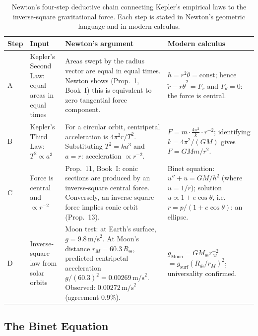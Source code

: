 \documentclass[12pt]{article}
\begin{document}
\begin{table}[h]
\centering
\renewcommand{\arraystretch}{1.3}
\caption{Newton's four-step deductive chain connecting Kepler's empirical
  laws to the inverse-square gravitational force.
  Each step is stated in Newton's geometric language and in modern calculus.}
\label{tab:newton_chain}
\begin{tabular}{@{}p{1.0cm}p{2.7cm}p{4.9cm}p{4.9cm}@{}}
\toprule
\textbf{Step} & \textbf{Input} & \textbf{Newton's argument} & \textbf{Modern calculus} \\
\midrule
A &
  Kepler's Second Law: equal areas in equal times &
  Areas swept by the radius vector are equal in equal times.
  Newton shows (Prop.~1, Book~I) this is equivalent to zero tangential
  force component. &
  $h = r^{2}\dot\theta = \text{const}$;
  hence $\ddot r - r\dot\theta^{2} = F_{r}$ and $F_{\theta}=0$:
  the force is central. \\
\addlinespace
B &
  Kepler's Third Law: $T^{2}\propto a^{3}$ &
  For a circular orbit, centripetal acceleration is $4\pi^{2}r/T^{2}$.
  Substituting $T^{2}=ka^{3}$ and $a=r$: acceleration $\propto r^{-2}$. &
  $F = m\cdot\frac{4\pi^{2}}{k}\cdot r^{-2}$;
  identifying $k=4\pi^{2}/(GM)$ gives $F=GM m/r^{2}$. \\
\addlinespace
C &
  Force is central and $\propto r^{-2}$ &
  Prop.~11, Book~I: conic sections are produced by an inverse-square central
  force.  Conversely, an inverse-square force implies conic orbit (Prop.~13). &
  Binet equation: $u'' + u = GM/h^{2}$
  (where $u=1/r$); solution $u\propto 1+e\cos\theta$,
  i.e.\ $r=p/(1+e\cos\theta)$: an ellipse. \\
\addlinespace
D &
  Inverse-square law from solar orbits &
  Moon test: at Earth's surface, $g=9.8\,\text{m/s}^{2}$.
  At Moon's distance $r_M=60.3\,R_\oplus$, predicted centripetal
  acceleration $g/(60.3)^{2}=0.00269\,\text{m/s}^{2}$.
  Observed: $0.00272\,\text{m/s}^{2}$ (agreement 0.9\%). &
  $g_{\text{Moon}} = GM_\oplus r_M^{-2}$
  ${}= g_{\text{surf}}(R_\oplus/r_M)^{2}$;
  universality confirmed. \\
\bottomrule
\end{tabular}
\end{table}

\subsection{The Binet Equation}
\end{document}
